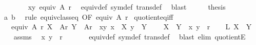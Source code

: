 \begin{isabellebody}
\ \ \ \ \ \ \isamarkupfalse%
\ xy\ {\isacartoucheopen}equiv\ A\ r{\isacartoucheclose}\ \isamarkupfalse%
\ equiv{\isacharunderscore}{\kern0pt}def\ sym{\isacharunderscore}{\kern0pt}def\ trans{\isacharunderscore}{\kern0pt}def\ \isamarkupfalse%
\ blast\isanewline
\ \ \isamarkupfalse%
\ \isamarkupfalse%
\ {\isacharquery}{\kern0pt}thesis\isanewline
\ \ \ \ \isamarkupfalse%
\ a\ b\ \isamarkupfalse%
\ {\isacharparenleft}{\kern0pt}rule\ equiv{\isacharunderscore}{\kern0pt}class{\isacharunderscore}{\kern0pt}eq\ {\isacharbrackleft}{\kern0pt}OF\ {\isacartoucheopen}equiv\ A\ r{\isacartoucheclose}{\isacharbrackright}{\kern0pt}{\isacharparenright}{\kern0pt}\isanewline
{}\isamarkupfalse%
%
\endisatagproof
{\isafoldproof}%
%
\isadelimproof
\isanewline
%
\endisadelimproof
\isanewline
{}\isamarkupfalse%
\ quotient{\isacharunderscore}{\kern0pt}eq{\isacharunderscore}{\kern0pt}iff{\isacharcolon}{\kern0pt}\isanewline
\ \ \ {\isachardoublequoteopen}equiv\ A\ r{\isachardoublequoteclose}\ {\isachardoublequoteopen}X\ {\isasymin}\ A{\isacharslash}{\kern0pt}{\isacharslash}{\kern0pt}r{\isachardoublequoteclose}\ {\isachardoublequoteopen}Y\ {\isasymin}\ A{\isacharslash}{\kern0pt}{\isacharslash}{\kern0pt}r{\isachardoublequoteclose}\ \ xy{\isacharcolon}{\kern0pt}\ {\isachardoublequoteopen}x\ {\isasymin}\ X{\isachardoublequoteclose}\ {\isachardoublequoteopen}y\ {\isasymin}\ Y{\isachardoublequoteclose}\ \isanewline
\ \ \ {\isachardoublequoteopen}X\ {\isacharequal}{\kern0pt}\ Y\ {\isasymlongleftrightarrow}\ {\isacharparenleft}{\kern0pt}x{\isacharcomma}{\kern0pt}\ y{\isacharparenright}{\kern0pt}\ {\isasymin}\ r{\isachardoublequoteclose}\isanewline
%
\isadelimproof
%
\endisadelimproof
%
\isatagproof
{}\isamarkupfalse%
\isanewline
\ \ \isamarkupfalse%
\ L{\isacharcolon}{\kern0pt}\ {\isachardoublequoteopen}X\ {\isacharequal}{\kern0pt}\ Y{\isachardoublequoteclose}\ \isanewline
\ \ \isamarkupfalse%
\ assms\ \isamarkupfalse%
\ {\isachardoublequoteopen}{\isacharparenleft}{\kern0pt}x{\isacharcomma}{\kern0pt}\ y{\isacharparenright}{\kern0pt}\ {\isasymin}\ r{\isachardoublequoteclose}\ \isanewline
\ \ \ \ \isamarkupfalse%
\ equiv{\isacharunderscore}{\kern0pt}def\ sym{\isacharunderscore}{\kern0pt}def\ trans{\isacharunderscore}{\kern0pt}def\ \isamarkupfalse%
\ {\isacharparenleft}{\kern0pt}blast\ elim{\isacharbang}{\kern0pt}{\isacharcolon}{\kern0pt}\ quotientE{\isacharparenright}{\kern0pt}\isanewline

\end{isabellebody}
